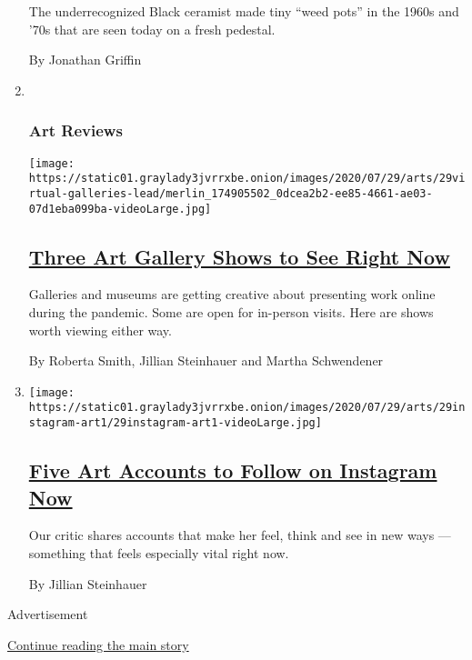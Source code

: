 \begin{enumerate}
  The underrecognized Black ceramist made tiny ``weed pots'' in the
  1960s and '70s that are seen today on a fresh pedestal.

  By Jonathan Griffin
\item ~
  \hypertarget{art-reviews}{%
  \subsubsection{Art Reviews}\label{art-reviews}}

  \texttt{[image: https://static01.graylady3jvrrxbe.onion/images/2020/07/29/arts/29virtual-galleries-lead/merlin\_174905502\_0dcea2b2-ee85-4661-ae03-07d1eba099ba-videoLarge.jpg]}

  \hypertarget{three-art-gallery-shows-to-see-right-now}{%
  \subsection{\texorpdfstring{\href{/2020/07/30/arts/design/virtual-art-gallery-shows.html}{Three
  Art Gallery Shows to See Right
  Now}}{Three Art Gallery Shows to See Right Now}}\label{three-art-gallery-shows-to-see-right-now}}

  Galleries and museums are getting creative about presenting work
  online during the pandemic. Some are open for in-person visits. Here
  are shows worth viewing either way.

  By Roberta Smith, Jillian Steinhauer and Martha Schwendener
\item
  \texttt{[image: https://static01.graylady3jvrrxbe.onion/images/2020/07/29/arts/29instagram-art1/29instagram-art1-videoLarge.jpg]}

  \hypertarget{five-art-accounts-to-follow-on-instagram-now}{%
  \subsection{\texorpdfstring{\href{/2020/07/29/arts/design/art-accounts-to-follow-instagram.html}{Five
  Art Accounts to Follow on Instagram
  Now}}{Five Art Accounts to Follow on Instagram Now}}\label{five-art-accounts-to-follow-on-instagram-now}}

  Our critic shares accounts that make her feel, think and see in new
  ways --- something that feels especially vital right now.

  By Jillian Steinhauer
\end{enumerate}

Advertisement

\protect\hyperlink{after-mid1}{Continue reading the main story}

